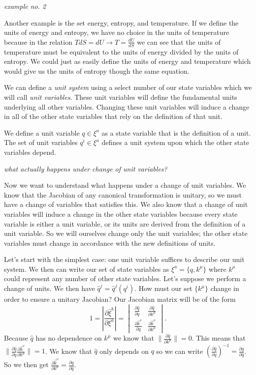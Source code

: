 \documentclass{article}
\begin{document}
	\emph{example no. 2}
	
	Another example is the set energy, entropy, and temperature. If we define the units of energy and entropy, we have no choice in the units of temperature because in the relation $T dS = dU \to T = \frac{dU}{dS}$ we can see that the units of temperature must be equivalent to the units of energy divided by the units of entropy. We could just as easily define the units of energy and temperature which would give us the units of entropy though the same equation.
	
	 We can define a \textit{unit system} using a select number of our state variables which we will call \textit{unit variables}. These unit variables will define the fundamental units underlying all other variables. Changing these unit variables will induce a change in all of the other state variables that rely on the definition of that unit.

\begin{defn}
	We define a unit variable $q \in \xi^a$ as a state variable that is the definition of a unit. The set of unit variables $q^i \in \xi^a$ defines a unit system upon which the other state variables depend.
\end{defn}

	\emph{what actually happens under change of unit variables?}

	Now we want to understand what happens under a change of unit variables. We know that the Jacobian of any canonical transformation is unitary, so we must have a change of variables that satisfies this. We also know that a change of unit variables will induce a change in the other state variables because every state variable is either a unit variable, or its units are derived from the definition of a unit variable. So we will ourselves change only the unit variables; the other state variables must change in accordance with the new definitions of units.
	
	Let's start with the simplest case: one unit variable suffices to describe our unit system. We then can write our set of state variables as $\xi^a = \{q,k^\mu\}$ where $k^\mu$ could represent any number of other state variables. Let's suppose we perform a change of units. We then have $\hat{q}^j = \hat{q}^j(q^i)$. How must our set $\{k^\mu\}$ change in order to ensure a unitary Jacobian? Our Jacobian matrix will be of the form $$1 = \left|\frac{\partial\hat{\xi}^b}{\partial\xi^a}\right| = \begin{vmatrix}
\frac{\partial \hat{q}}{\partial q} & \frac{\partial \hat{q}}{\partial k^\mu} \\
\frac{\partial \hat{k}^\nu}{\partial q} & \frac{\partial \hat{k}^\nu}{\partial k^\mu}
\end{vmatrix}.$$
Because $\hat{q}$ has no dependence on $k^\mu$ we know that $\|\frac{\partial \hat{q}}{\partial k^\mu}\| = 0$. This means that $\|\frac{\partial \hat{q}}{\partial q}\frac{\partial \hat{k}^\nu}{\partial k^\mu}\| = 1$. We know that $\hat{q}$ only depends on $q$ so we can write $(\frac{\partial \hat{q}}{\partial q})^{-1} = \frac{\partial q}{\partial \hat{q}}$. So we then get $\frac{\partial \hat{k}^\nu}{\partial k^\mu} = \frac{\partial q}{\partial \hat{q}}$.
\end{document}
